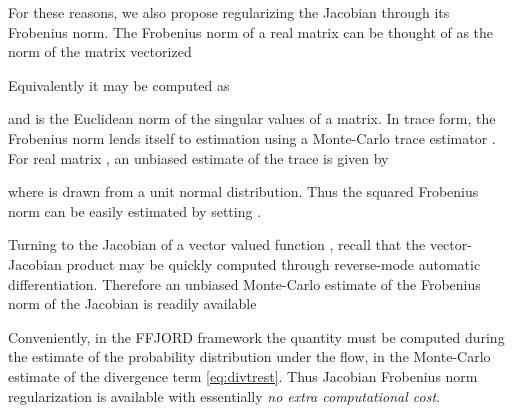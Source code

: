 \documentclass{article}
\theoremstyle{definition}
\theoremstyle{remark}
\begin{document}
For these reasons, we also propose regularizing the Jacobian through its Frobenius norm.
The Frobenius norm  of a real matrix  can be thought of as the
 norm of the matrix  vectorized

Equivalently it may be computed as

and is the Euclidean norm of the singular values of a matrix.
In trace form, the Frobenius norm lends itself to estimation using a Monte-Carlo trace
estimator \citep{hutchinson1990stochastic,avrom11}. For real matrix , an unbiased estimate of the trace is given by

where  is drawn from a unit normal distribution. Thus the squared
Frobenius norm can be easily estimated by setting .

Turning to the Jacobian  of a vector valued function
, recall that the vector-Jacobian product  may be quickly
computed through reverse-mode automatic differentiation. Therefore an unbiased
Monte-Carlo estimate of the Frobenius norm of the Jacobian is readily available

Conveniently, in the FFJORD framework the quantity  must be computed during the estimate of the probability
distribution under the flow, in the Monte-Carlo estimate of the divergence term
\eqref{eq:divtrest}. Thus Jacobian Frobenius norm regularization is
available with essentially \emph{no extra computational cost}.
 
\end{document}
